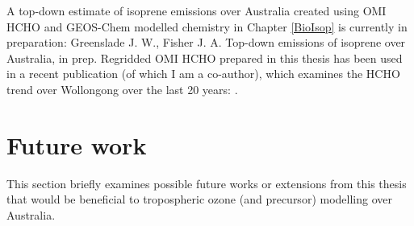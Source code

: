   A top-down estimate of isoprene emissions over Australia created using OMI HCHO and GEOS-Chem modelled chemistry in Chapter \ref{BioIsop} is currently in preparation: Greenslade J. W., Fisher J. A. Top-down emissions of isoprene over Australia, in prep.
  Regridded OMI HCHO prepared in this thesis has been used in a recent publication (of which I am a co-author), which examines the HCHO trend over Wollongong over the last 20 years: .
  
  
\section{Future work}
  \label{Conclusions:futurework}
  
  This section briefly examines possible future works or extensions from this thesis that would be beneficial to tropospheric ozone (and precursor) modelling over Australia.
  

